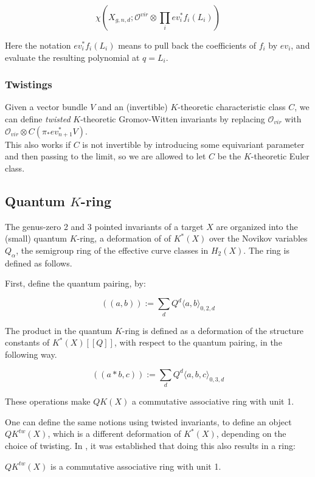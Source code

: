 \documentclass[11pt,letterpaper]{amsart}
\begin{document}
$$\chi(X_{g,n,d};\mathcal{O}^{vir}\otimes \prod_i ev_i^*f_i(L_i))$$

Here the notation $ev_i^*f_i(L_i)$ means to pull back the coefficients of $f_i$ by $ev_i$, and evaluate the resulting polynomial at $q=L_i$.
\subsubsection{Twistings}

Given a vector bundle $V$ and an (invertible) $K$-theoretic characteristic class $C$, we can define \emph{twisted} $K$-theoretic Gromov-Witten invariants by replacing $\mathcal{O}_{vir}$ with $\mathcal{O}_{vir}\otimes C(\pi_*ev_{n+1}^*V)$. \\

This also works if $C$ is not invertible by introducing some equivariant parameter and then passing to the limit, so we are allowed to let $C$ be the $K$-theoretic Euler class. 

\subsection{Quantum $K$-ring}

The genus-zero 2 and 3 pointed invariants of a target $X$ are organized into the (small) quantum $K$-ring, a deformation of of $K^*(X)$ over the Novikov variables $Q_\alpha$, the semigroup ring of the effective curve classes in $H_2(X)$. The ring is defined as follows. 

First, define the quantum pairing, by:

$$((a,b)):=\sum_d Q^d \langle a,b\rangle_{0,2,d}$$

The product in the quantum $K$-ring is defined as a deformation of the structure constants of $K^*(X)[[Q]]$, with respect to the quantum pairing, in the following way. 

$$((a*b,c)):=\sum_{d}Q^d\langle a,b,c\rangle_{0,3,d}$$

\begin{thm}[Y-P Lee]
These operations make $QK(X)$ a commutative associative ring with unit 1. 
\end{thm}

One can define the same notions using twisted invariants, to define an object $QK^{tw}(X)$, which is a different deformation of $K^*(X)$, depending on the choice of twisting. In \cite{me}, it was established that doing this also results in a ring:

\begin{thm}
$QK^{tw}(X)$ is a commutative associative ring with unit 1. 
\end{thm}
\end{document}
